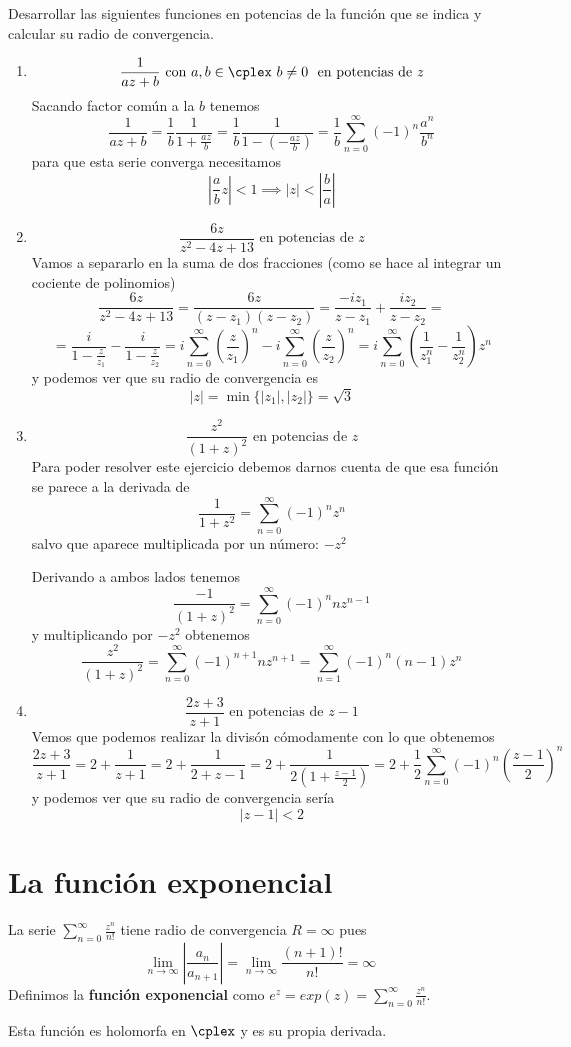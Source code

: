 \documentclass{apuntes}
\begin{document}
\begin{example}
Desarrollar las siguientes funciones en potencias de la función que se indica y calcular su radio de convergencia.
\begin{enumerate}
\item
\[\frac{1}{az+b} \text{ con } a,b \in \cplex \ b \neq 0 \ \text{ en potencias de } z\]
Sacando factor común a la $b$ tenemos
\[\frac{1}{az+b} =  \frac{1}{b} \frac{1}{1+\frac{az}{b}} = \frac{1}{b}\frac{1}{1-\left(-\frac{az}{b}\right)} = \frac{1}{b}\sum_{n=0}^{\infty}(-1)^n\frac{a^n}{b^n}\]
para que esta serie converga necesitamos
\[\left| \frac{a}{b}z\right| < 1 \implies |z| < \left| \frac{b}{a} \right|\]

\item
\[\frac{6z}{z^2-4z+13} \text{ en potencias de } z\]
Vamos a separarlo en la suma de dos fracciones (como se hace al integrar un cociente de polinomios)
\[\frac{6z}{z^2-4z+13} = \frac{6z}{(z-z_1)(z-z_2)} = \frac{-iz_1}{z-z_1} + \frac{iz_2}{z-z_2} = \]
\[= \frac{i}{1-\frac{z}{z_1}} - \frac{i}{1-\frac{z}{z_2}} = i\sum_{n=0}^{\infty}\left(\frac{z}{z_1}\right)^n - i\sum_{n=0}^{\infty}\left(\frac{z}{z_2}\right)^n = i\sum_{n=0}^{\infty}\left( \frac{1}{z_1^n}-\frac{1}{z_2^n}\right)z^n\]
y podemos ver que su radio de convergencia es
\[|z| = \min \{|z_1|, |z_2|\}= \sqrt{3}\]

\item
\[\frac{z^2}{(1+z)^2} \text{ en potencias de } z\]
Para poder resolver este ejercicio debemos darnos cuenta de que esa función se parece a la derivada de
\[\frac{1}{1+z^2} = \sum_{n=0}^{\infty}(-1)^n z^n\]
salvo que aparece multiplicada por un número: $-z^2$

Derivando a ambos lados tenemos
\[\frac{-1}{(1+z)^2}=\sum_{n=0}^{\infty}(-1)^nnz^{n-1}\]
y multiplicando por $-z^2$ obtenemos
\[\frac{z^2}{(1+z)^2} = \sum_{n=0}^{\infty}(-1)^{n+1}nz^{n+1} = \sum_{n=1}^{\infty}(-1)^n(n-1)z^{n}\]

\item
\[\frac{2z+3}{z+1} \text{ en potencias de } z-1\]
Vemos que podemos realizar la divisón cómodamente con lo que obtenemos
\[\frac{2z+3}{z+1}=2+\frac{1}{z+1} = 2 + \frac{1}{2+z-1} = 2 + \frac{1}{2\left( 1+\frac{z-1}{2}\right)} = 2+\frac{1}{2}\sum_{n=0}^{\infty}(-1)^n\left(\frac{z-1}{2} \right)^n\]
y podemos ver que su radio de convergencia sería
\[|z-1| < 2\]

\end{enumerate}
\end{example}

\section{La función exponencial}
\begin{defn}
La serie $\sum_{n=0}^{\infty}\frac{z^n}{n!}$ tiene radio de convergencia $R=\infty$ pues
\[\lim_{n \to \infty}\left| \frac{a_n}{a_{n+1}}\right| = \lim_{n \to \infty} \frac{(n+1)!}{n!} = \infty\]
Definimos la \textbf{función exponencial} como $e^z=exp(z)=\sum_{n=0}^{\infty}\frac{z^n}{n!}$.

Esta función es holomorfa en $\cplex$ y es su propia derivada.
\end{defn}
\end{document}
